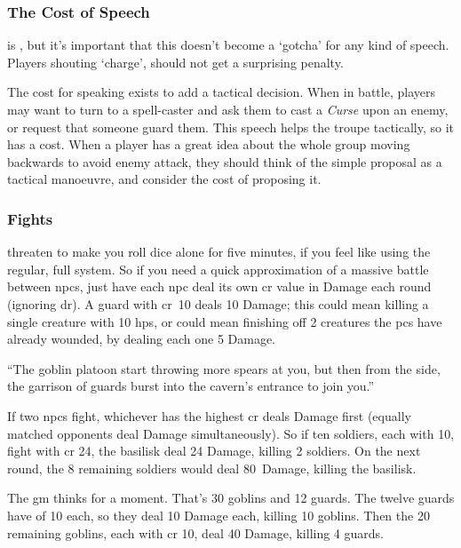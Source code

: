 \begin{multicols}{2}
\subsubsection{The Cost of Speech}
is , but it's important that this doesn't become a `gotcha' for any kind of speech.
Players shouting `charge', should not get a surprising penalty.

The cost for speaking exists to add a tactical decision.
When in battle, players may want to turn to a spell-caster and ask them to cast a \textit{Curse} upon an enemy, or request that someone guard them.
This speech helps the troupe tactically, so it has a cost.
When a player has a great idea about the whole group moving backwards to avoid enemy attack, they should think of the simple proposal as a tactical manoeuvre, and consider the cost of proposing it.

\subsubsection{ Fights}
\label{npcfights}
threaten to make you roll dice alone for five minutes, if you feel like using the regular, full system.
So if you need a quick approximation of a massive battle between \glspl{npc}, just have each \gls{npc} deal its own \gls{cr} value in Damage each round (ignoring \gls{dr}).
A guard with \gls{cr}~10 deals 10 Damage; this could mean killing a single creature with 10 \glspl{hp}, or could mean finishing off 2 creatures the \glspl{pc} have already wounded, by dealing each one 5 Damage.

\begin{exampletext}
  ``The goblin platoon start throwing more spears at you, but then from the side, the garrison of guards burst into the cavern's entrance to join you.''
\end{exampletext}

If two \glspl{npc} fight, whichever has the highest \gls{cr} deals Damage first (equally matched opponents deal Damage simultaneously).
So if ten soldiers, each with  10, fight  with \gls{cr} 24, the \gls{basilisk} deal 24 Damage, killing 2 soldiers.
On the next \gls{round}, the 8 remaining soldiers would deal 80~Damage, killing the \gls{basilisk}.

\begin{exampletext}

  The \gls{gm} thinks for a moment.
  That's 30 goblins and 12 guards.
  The twelve guards have  of 10 each, so they deal 10 Damage each, killing 10 goblins.
  Then the 20 remaining goblins, each with \gls{cr} 10, deal 40 Damage, killing 4 guards.


\end{exampletext}
\end{multicols}
